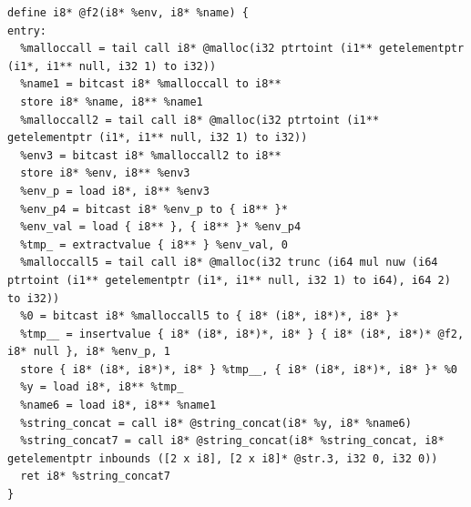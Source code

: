 \documentclass[12pt]{article}
\begin{document}
\begin{mdframed}[hidealllines=true,backgroundcolor=green!10]
\begin{lstlisting}
define i8* @f2(i8* %env, i8* %name) {
entry:
  %malloccall = tail call i8* @malloc(i32 ptrtoint (i1** getelementptr (i1*, i1** null, i32 1) to i32))
  %name1 = bitcast i8* %malloccall to i8**
  store i8* %name, i8** %name1
  %malloccall2 = tail call i8* @malloc(i32 ptrtoint (i1** getelementptr (i1*, i1** null, i32 1) to i32))
  %env3 = bitcast i8* %malloccall2 to i8**
  store i8* %env, i8** %env3
  %env_p = load i8*, i8** %env3
  %env_p4 = bitcast i8* %env_p to { i8** }*
  %env_val = load { i8** }, { i8** }* %env_p4
  %tmp_ = extractvalue { i8** } %env_val, 0
  %malloccall5 = tail call i8* @malloc(i32 trunc (i64 mul nuw (i64 ptrtoint (i1** getelementptr (i1*, i1** null, i32 1) to i64), i64 2) to i32))
  %0 = bitcast i8* %malloccall5 to { i8* (i8*, i8*)*, i8* }*
  %tmp__ = insertvalue { i8* (i8*, i8*)*, i8* } { i8* (i8*, i8*)* @f2, i8* null }, i8* %env_p, 1
  store { i8* (i8*, i8*)*, i8* } %tmp__, { i8* (i8*, i8*)*, i8* }* %0
  %y = load i8*, i8** %tmp_
  %name6 = load i8*, i8** %name1
  %string_concat = call i8* @string_concat(i8* %y, i8* %name6)
  %string_concat7 = call i8* @string_concat(i8* %string_concat, i8* getelementptr inbounds ([2 x i8], [2 x i8]* @str.3, i32 0, i32 0))
  ret i8* %string_concat7
}


\end{lstlisting}
\end{mdframed}
\end{document}
